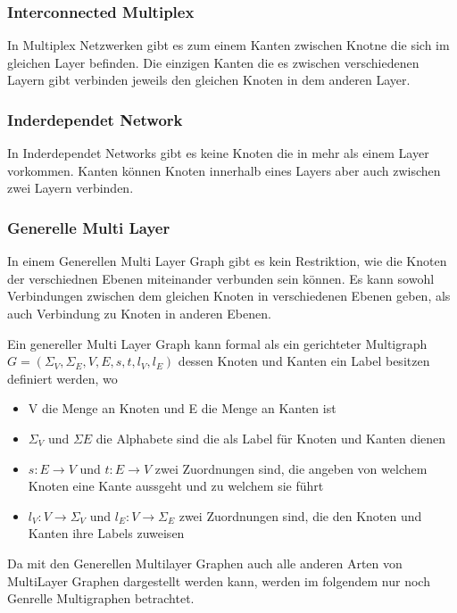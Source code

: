 \subsubsection{Interconnected Multiplex}

In Multiplex Netzwerken gibt es zum einem Kanten zwischen Knotne die sich im gleichen Layer befinden. Die einzigen Kanten die es zwischen verschiedenen Layern gibt verbinden jeweils den gleichen Knoten in dem anderen Layer. 

\subsubsection{Inderdependet Network}

In Inderdependet Networks gibt es keine Knoten die in mehr als einem Layer vorkommen. Kanten können Knoten innerhalb eines Layers aber auch zwischen zwei Layern verbinden.

\subsubsection{Generelle Multi Layer}
In einem Generellen Multi Layer Graph gibt es kein Restriktion, wie die Knoten der verschiednen Ebenen miteinander verbunden sein können. Es kann sowohl Verbindungen zwischen dem gleichen Knoten in verschiedenen Ebenen geben, als auch Verbindung zu Knoten in anderen Ebenen.


Ein genereller Multi Layer Graph kann formal als ein gerichteter Multigraph\cite{article} $G = (\Sigma_{V}, \Sigma_{E}, V, E, s, t, l_{V}, l_{E})$ dessen Knoten und Kanten ein Label besitzen  definiert werden, wo

\begin{itemize}
  \item V die Menge an Knoten und E die Menge an Kanten ist
  \item $\Sigma_{V}$ und $\Sigma{E}$ die Alphabete sind die als Label für Knoten und Kanten dienen
  \item $s: E \rightarrow V$ und $t: E \rightarrow V$ zwei Zuordnungen sind, die angeben von welchem Knoten eine Kante aussgeht und zu welchem sie führt
  \item $l_{V}: V \rightarrow \Sigma_{V}$ und $l_{E}: V \rightarrow \Sigma_{E}$ zwei Zuordnungen sind, die den Knoten und Kanten ihre Labels zuweisen
\end{itemize}

Da mit den Generellen Multilayer Graphen auch alle anderen Arten von MultiLayer Graphen dargestellt werden kann, werden im folgendem nur noch Genrelle Multigraphen betrachtet.
